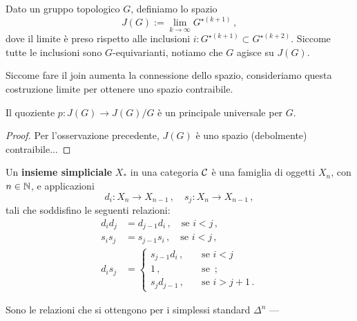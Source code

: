 \begin{df}
	Dato un gruppo topologico $G$, definiamo lo spazio
	\begin{equation*}
		J(G) := \lim_{k \to \infty} G^{\star(k+1)}\,,
	\end{equation*}
	dove il limite è preso rispetto alle inclusioni 
	$i:G^{\star(k+1)} \subset G^{\star(k+2)}$.
	Siccome tutte le inclusioni sono $G$-equivarianti,
	notiamo che $G$ agisce su $J(G)$.
\end{df}

Siccome fare il join aumenta la connessione dello spazio,
consideriamo questa costruzione limite per ottenere
uno spazio contraibile.


\begin{thm}
	Il quoziente $p:J(G) \to J(G)/G$ è un principale universale per $G$.
	\begin{proof}
		Per l'osservazione precedente,
		$J(G)$ è uno spazio (debolmente) contraibile...
	\end{proof}
\end{thm}

\begin{df}
	Un \textbf{insieme simpliciale} $X_{*}$ in una categoria $\mathcal{C}$ 
	è una famiglia di oggetti $X_{n}$, con $n \in {\mathbb N}$, e applicazioni
	\begin{equation*}
		d_{i}: X_{n} \longrightarrow X_{n-1}\,, \quad s_{j}:X_{n} \longrightarrow X_{n-1}\,,
	\end{equation*}
	tali che soddisfino le seguenti relazioni:
	\begin{align*}
		d_{i}d_{j} &= d_{j-1} d_{i}\,, \quad \text{se } i<j\,,\\
		s_{i}s_{j} &= s_{j-1} s_{i}\,, \quad \text{se } i<j\,,\\
		d_{i}s_{j} &=
		\begin{cases}
			s_{j-1}d_{i}\,, \quad &\text{se } i < j\; \\
			1\,, \quad &\text{se }\,;\\
			s_{j}d_{j-1}\,, \quad &\text{se } i > j+1\,.
		\end{cases}
	\end{align*}
\end{df}

Sono le relazioni che si ottengono per i simplessi standard $\Delta^{n}$
---

